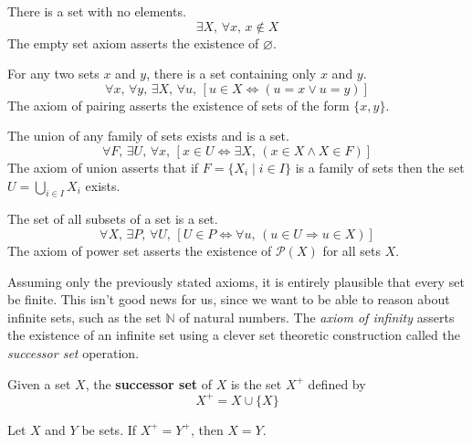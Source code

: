 \begin{axiom}
\label{axZFCEmptySet}
There is a set with no elements.
\[ \exists X,\, \forall x,\, x \not \in X \]
The empty set axiom asserts the existence of $\varnothing$.
\end{axiom}

\begin{axiom}
\label{axZFCPairing}
For any two sets $x$ and $y$, there is a set containing only $x$ and $y$.
\[ \forall x,\, \forall y,\, \exists X,\, \forall u,\, [u \in X \Leftrightarrow (u=x \vee u=y)] \]
The axiom of pairing asserts the existence of sets of the form $\{ x, y \}$.
\end{axiom}

\begin{axiom}
\label{axZFCUnion}
The union of any family of sets exists and is a set.
\[ \forall F,\, \exists U,\, \forall x,\, [x \in U \Leftrightarrow \exists X,\, (x \in X \wedge X \in F)] \]
The axiom of union asserts that if $F = \{ X_i \mid i \in I \}$ is a family of sets then the set $U=\bigcup_{i \in I} X_i$ exists.
\end{axiom}

\begin{axiom}
\label{axZFCPowerSet}
The set of all subsets of a set is a set.
\[ \forall X,\, \exists P,\, \forall U,\, [U \in P \Leftrightarrow \forall u,\, (u \in U \Rightarrow u \in X)] \]
The axiom of power set asserts the existence of $\mathcal{P}(X)$ for all sets $X$.
\end{axiom}

Assuming only the previously stated axioms, it is entirely plausible that every set be finite. This isn't good news for us, since we want to be able to reason about infinite sets, such as the set $\mathbb{N}$ of natural numbers. The \textit{axiom of infinity} asserts the existence of an infinite set using a clever set theoretic construction called the \textit{successor set} operation.

\begin{definition}
\label{defSuccessorSet}
\label{successor set}
Given a set $X$, the \textbf{successor set} of $X$ is the set $X^+$ defined by
\[ X^+ = X \cup \{ X \} \]
\end{definition}

\begin{lemma}
\label{lemSuccessorSetIsInjective}
Let $X$ and $Y$ be sets. If $X^+ = Y^+$, then $X=Y$.
\end{lemma}

